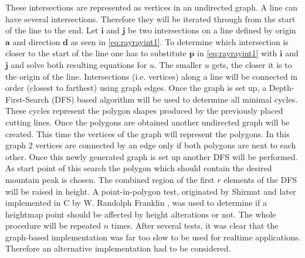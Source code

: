 \documentclass[11pt,a4paper,twoside,openright]{report}
\begin{document}
These intersections are represented as vertices in an undirected graph. A line can have several intersections. Therefore they will be iterated through from the start of the line to the end. Let $\mathbf{i}$ and $\mathbf{j}$ be two intersections on a line defined by origin $\mathbf{a}$ and direction $\mathbf{d}$ as seen in \cref{eq:rayrayint1}. To determine which intersection is closer to the start of the line one has to substitute $\mathbf{p}$ in \cref{eq:rayrayint1} with $\mathbf{i}$ and $\mathbf{j}$ and solve both resulting equations for $u$. The smaller $u$ gets, the closer it is to the origin of the line. Intersections (i.e. vertices) along a line will be connected in order (closest to farthest) using graph edges. Once the graph is set up, a Depth-First-Search (DFS) based algorithm will be used to determine all minimal cycles. These cycles represent the polygon shapes produced by the previously placed cutting lines. Once the polygons are obtained another undirected graph will be created. This time the vertices of the graph will represent the polygons. In this graph 2 vertices are connected by an edge only if both polygons are next to each other. Once this newly generated graph is set up another DFS will be performed. As start point of this search the polygon which should contain the desired mountain peak is chosen. The combined region of the first $r$ elements of the DFS will be raised in height. A point-in-polygon test, originated by Shirmat \cite{Shimrat:1962:APP:368637.368653} and later implemented in C by W. Randolph Franklin \cite{Franklin:1994}, was used to determine if a heightmap point should be affected by height alterations or not. The whole procedure will be repeated $n$ times. After several tests, it was clear that the graph-based implementation was far too slow to be used for realtime applications. Therefore an alternative implementation had to be considered.
\end{document}
